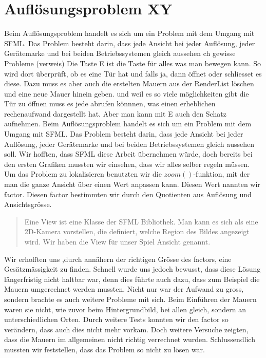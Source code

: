 \documentclass[11pt,a4paper]{scrbook}
\begin{document}
\section{Auflösungsproblem XY} 	
\label{aufloesungsprobleme} 	
Beim Auflösungsproblem handelt es sich um ein Problem mit dem Umgang mit SFML. 	
Das Problem besteht darin, dass jede Ansicht bei jeder Auflösung, jeder Gerätemarke und bei beiden Betriebssystemen gleich aussehen ch gewisse Probleme (verweis) 	
Die Taste E ist die Taste für alles was man bewegen kann. So wird dort überprüft, ob es eine Tür hat und falls ja, dann öffnet oder schliesset es diese. Dazu muss es aber auch die erstelten Mauern aus der RenderList löschen und eine neue Mauer hinein geben. und weil es so viele möglichkeiten gibt die Tür zu öffnen muss es jede abrufen könnnen, was einen erheblichen rechenaufwand dargestellt hat. Aber man kann mit E auch den Schatz aufnehmen.
\label{aufloesungsprobleme}
Beim Auflösungsproblem handelt es sich um ein Problem mit dem Umgang mit SFML.
Das Problem besteht darin, dass jede Ansicht bei jeder Auflösung, jeder Gerätemarke und bei beiden Betriebssystemen gleich aussehen soll.
Wir hofften, dass SFML diese Arbeit übernehmen würde, doch bereits bei den ersten Grafiken mussten wir einsehen, dass wir alles selber regeln müssen.
Um das Problem zu lokalisieren benutzten wir die $zoom()$-funktion, mit der man die ganze Ansicht über einen Wert anpassen kann.
Diesen Wert nannten wir factor.
Diesen factor bestimmten wir durch den Quotienten aus Auflösung und Ansichtsgrösse.
\begin{quote}
Eine View ist eine Klasse der SFML Bibliothek.
Man kann es sich als eine 2D-Kamera vorstellen, die definiert, welche Region des Bildes angezeigt wird.
Wir haben die View für unser Spiel Ansicht genannt.
\end{quote}
Wir erhofften uns ,durch annähern der richtigen Grösse des factors, eine Gesätzmässigkeit zu finden.
Schnell wurde uns jedoch bewusst, dass diese Lösung längerfristig nicht haltbar war,
denn dies führte auch dazu, dass zum Beispiel die Mauern umgerechnet werden mussten.
Nicht nur war der Aufwand zu gross, sondern brachte es auch weitere Probleme mit sich.
Beim Einführen der Mauern waren sie nicht, wie zuvor beim Hintergrundbild, 
bei allen gleich, sondern an unterschiedlichen Orten.
Durch weitere Tests konnten wir den factor so verändern, dass auch dies nicht mehr vorkam.
Doch weitere Versuche zeigten, dass die Mauern im allgemeinen nicht richtig verrechnet wurden.
Schlussendlich mussten wir feststellen, dass das Problem so nicht zu lösen war.
\end{document}

